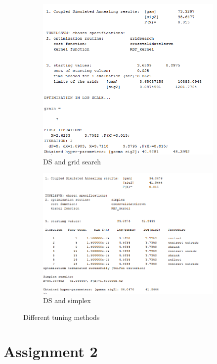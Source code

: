 \documentclass[11pt,oneside,a4paper]{article}
\begin{document}
\begin{figure}[H]
\begin{subfigure}[b]{0.4\textwidth}
		\includegraphics[width=\textwidth]{../Figures/diabetes_DS_grid}
		\caption{DS and grid search}
	\end{subfigure}
	\begin{subfigure}[b]{0.4\textwidth}
		\includegraphics[width=\textwidth]{../Figures/diabetes_DS_simp}
		\caption{DS and simplex}
	\end{subfigure}
	\caption{Different tuning methods}
	
\end{figure}

\section{Assignment 2}
\end{document}
